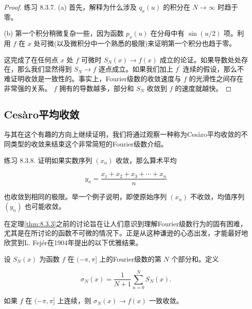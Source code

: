 \begin{proof}
练习 8.3.7. (a) 首先，解释为什么涉及 \({q}_{x}\left( u\right)\) 的积分在 \(N \rightarrow  \infty\) 时趋于零。

(b) 第一个积分稍微复杂一些，因为函数 \({p}_{x}\left( u\right)\) 在分母中有 \(\sin \left( {u/2}\right)\) 项。利用 \(f\) 在 \(x\) 处可微(以及微积分中一个熟悉的极限)来证明第一个积分也趋于零。

这完成了在任何点 \(x\) 处 \(f\) 可微时 \({S}_{N}\left( x\right)  \rightarrow  f\left( x\right)\) 成立的论证。如果导数处处存在，那么我们显然得到 \({S}_{N} \rightarrow  f\) 逐点成立。如果我们加上 \({f}^{\prime }\) 连续的假设，那么不难证明收敛是一致性的。事实上，Fourier级数的收敛速度与 \(f\) 的光滑性之间存在非常强的关系。 \(f\) 拥有的导数越多，部分和 \({S}_{N}\) 收敛到 \(f\) 的速度就越快。  
\end{proof}


\subsection{Ces\`aro平均收敛}

与其在这个有趣的方向上继续证明，我们将通过观察一种称为Ces\`aro平均收敛的不同类型的收敛来结束这个非常简短的Fourier级数介绍。

练习 8.3.8. 证明如果实数序列 \(\left( {x}_{n}\right)\) 收敛，那么算术平均

\[
{y}_{n} = \frac{{x}_{1} + {x}_{2} + {x}_{3} + \cdots  + {x}_{n}}{n}
\]

也收敛到相同的极限。举一个例子说明，即使原始序列 \(\left( {x}_{n}\right)\) 不收敛，均值序列 \(\left( {y}_{n}\right)\) 也可能收敛。

在定理\ref{thm:8.3.3}之前的讨论旨在让人们意识到理解Fourier级数行为的固有困难，尤其是在所讨论的函数不可微的情况下。正是从这种谦逊的心态出发，才能最好地欣赏到L. Fejér在1904年提出的以下优雅结果。


\begin{Thm}[Fej\'er 定理]
  \label{thm:8.3.4}
  设 \({S}_{N}\left( x\right)\) 为函数 \(f\) 在 \(( - \pi ,\pi \rbrack\) 上的Fourier级数的第 \(N\) 个部分和。定义

\[
{\sigma }_{N}\left( x\right)  = \frac{1}{N + 1}\mathop{\sum }\limits_{{n = 0}}^{N}{S}_{N}\left( x\right) .
\]

如果 \(f\) 在 \(( - \pi ,\pi \rbrack\) 上连续，则 \({\sigma }_{N}\left( x\right)  \rightarrow  f\left( x\right)\) 一致收敛。
\end{Thm}

